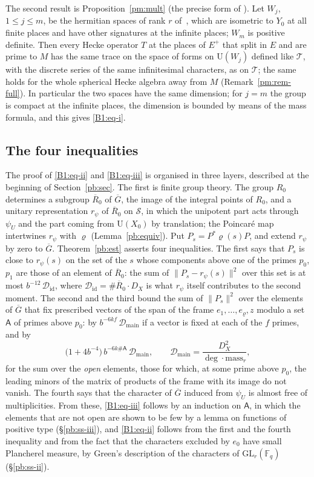 \documentclass[10pt]{amsart}
\theoremstyle{definition}
\theoremstyle{remark}
\providecommand{\auDX}{D_X}
\providecommand{\auF}{\mathbb F}
\providecommand{\auG}{\overline G}
\providecommand{\auGL}{\mathrm{GL}}
\providecommand{\auS}{\mathcal S}
\providecommand{\auT}{\mathcal T}
\providecommand{\auU}{\mathrm U}
\providecommand{\pbDid}{\mathcal D_{\mathrm{id}}}
\providecommand{\pbDmain}{\mathcal D_{\mathrm{main}}}
\providecommand{\pbR}{\overline R_0}
\providecommand{\pbrpsi}{r_\psi}
\begin{document}
The second result is Proposition~\ref{pm:mult} (the precise form of
{\cite[Proposition~14.36]{P46}}). Let $W_j$, $1\le j\le m$, be the hermitian spaces of rank $r$
of~\cite{P46}, which are isometric to $Y_0$ at all finite places and have other signatures at the
infinite places; $W_m$ is positive definite. Then every Hecke operator $T$ at the places of $E^+$ that
split in $E$ and are prime to $M$ has the same trace on the space of forms on $\auU(W_j)$ defined
like $\auT$, with the discrete series of the same infinitesimal characters, as on $\auT$; the same
holds for the whole spherical Hecke algebra away from $M$ (Remark~\ref{pm:rem-full}). In
particular the two spaces have the same dimension; for $j=m$ the group is compact at the infinite
places, the dimension is bounded by means of the mass formula, and this gives \eqref{B1:eq-i}.

\subsection*{The four inequalities}
The proof of \eqref{B1:eq-ii} and \eqref{B1:eq-iii} is organised in three layers, described at
the beginning of Section~\ref{pb:sec}. The first is finite group theory. The group $R_0$
determines a subgroup $\pbR$ of $\auG$, the image of the integral points of $R_0$, and a unitary
representation $\pbrpsi$ of $\pbR$ on $\auS$, in which the unipotent part acts through $\psi_U$
and the part coming from $\auU(X_0)$ by translation; the Poincar\'e map intertwines $\pbrpsi$ with
$\varrho$ (Lemma~\ref{pb:equiv}). Put $P_s=P^*\varrho(s)P$, and extend $\pbrpsi$ by zero to
$\auG$. Theorem~\ref{pb:est} asserts four inequalities. The first says that $P_s$ is close to
$\pbrpsi(s)$ on the set of the $s$ whose components above one of the primes $p_0$, $p_1$ are
those of an element of $\pbR$: the sum of $\|P_s-\pbrpsi(s)\|^2$ over this set is at most
$b^{-12}\,\pbDid$, where $\pbDid=\#\pbR\cdot\auDX$ is what $\pbrpsi$ itself contributes to the
second moment. The second and the third bound the sum of $\|P_s\|^2$ over the elements of $\auG$
that fix prescribed vectors of the span of the frame $e_1,\dots,e_\varrho,z$ modulo a set
$\mathsf A$ of primes above $p_0$: by $b^{-6kf}\,\pbDmain$ if a vector is fixed at each of the $f$
primes, and by
\[
\bigl(1+4b^{-4}\bigr)\,b^{-6k\#\mathsf A}\,\pbDmain,\qquad\pbDmain=\frac{\auDX^2}{\deg\cdot
\mathrm{mass}_r},
\]
for the sum over the \emph{open} elements, those for which, at some prime above $p_0$, the
leading minors of the matrix of products of the frame with its image do not vanish. The fourth
says that the character of $\auG$ induced from $\psi_U$ is almost free of multiplicities. From
these, \eqref{B1:eq-iii} follows by an induction on $\mathsf A$, in which the elements that are
not open are shown to be few by a lemma on functions of positive type (\S\ref{pb:ss-iii}), and
\eqref{B1:eq-ii} follows from the first and the fourth inequality and from the fact that the
characters excluded by $e_0$ have small Plancherel measure, by Green's description of the
characters of $\auGL_r(\auF_q)$~\cite{Green1955} (\S\ref{pb:ss-ii}).
\end{document}
